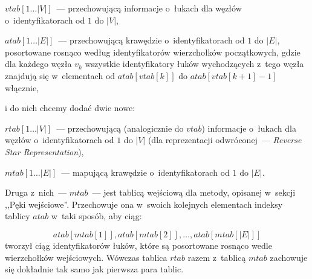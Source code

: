 \begin{myitemize}
	\item $vtab \left[ 1 \dots \left| V \right| \right]$~--- przechowującą informacje o~łukach dla węzłów o~identyfikatorach od $1$ do $\left| V \right|$,
	\item $atab \left[ 1 \dots \left| E \right| \right]$~--- przechowującą krawędzie o~identyfikatorach od $1$ do $\left| E \right|$, posortowane rosnąco według identyfikatorów wierzchołków początkowych, gdzie dla każdego węzła $v_{k}$ wszystkie identyfikatory łuków wychodzących z~tego węzła znajdują się w~elementach od $atab \left[ vtab \left[ k \right] \right]$ do $atab \left[ vtab \left[ k+1 \right] -1 \right]$ włącznie,
\end{myitemize}
i do nich chcemy dodać dwie nowe:
\begin{myitemize}
	\item $rtab \left[ 1 \dots \left| V \right| \right]$~--- przechowującą (analogicznie do $vtab$) informacje o~łukach dla węzłów o~identyfikatorach od $1$ do $\left| V \right|$ (dla reprezentacji odwróconej~--- \textit{Reverse Star Representation}),
	\item $mtab \left[ 1 \dots \left| E \right| \right]$~--- mapującą krawędzie o~identyfikatorach od $1$ do $\left| E \right|$.
\end{myitemize}

Druga z~nich~--- $mtab$~--- jest tablicą wejściową dla metody, opisanej w~sekcji ,,Pęki wejściowe''.
Przechowuje ona w~swoich kolejnych elementach indeksy tablicy $atab$ w~taki sposób, aby ciąg:

\begin{equation}
	atab \left[ mtab \left[ 1 \right] \right], atab \left[ mtab \left[ 2 \right] \right], \dots, atab \left[ mtab \left[ \left| E \right| \right] \right]
\end{equation}
tworzył ciąg identyfikatorów łuków, które są posortowane rosnąco wedle wierzchołków wejściowych.
Wówczas tablica $rtab$ razem z~tablicą $mtab$ zachowuje się dokładnie tak samo jak pierwsza para tablic.

